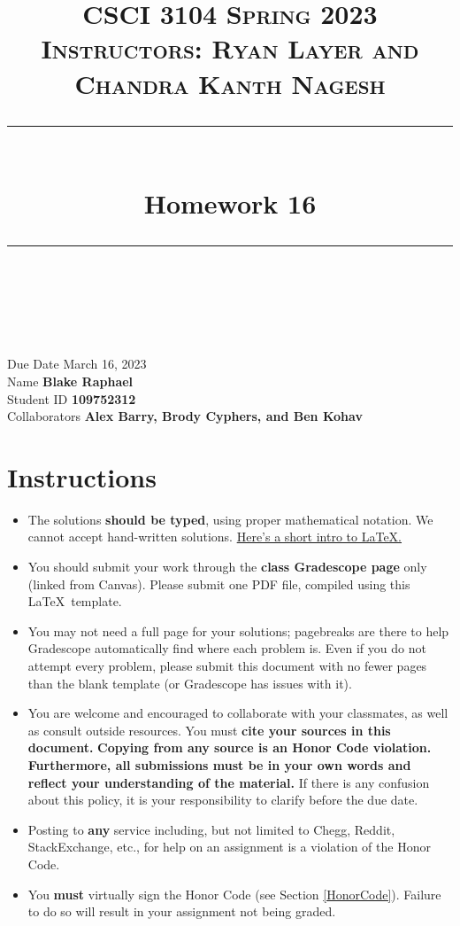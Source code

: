 \documentclass[11pt]{article}
\title{
\normalfont \normalsize 
\textsc{CSCI 3104 Spring 2023 \\ 
Instructors: Ryan Layer and Chandra Kanth Nagesh} \\
[10pt] 
\rule{\linewidth}{0.5pt} \\[6pt] 
\huge Homework 16 \\
\rule{\linewidth}{2pt}  \\[10pt]
}
\author{}
\date{}
\theoremstyle{definition}
\theoremstyle{definition}
\theoremstyle{definition}
\begin{document}

\maketitle


\noindent
Due Date \dotfill March 16, 2023 \\
Name \dotfill \textbf{Blake Raphael} \\
Student ID \dotfill \textbf{109752312} \\
Collaborators \dotfill \textbf{Alex Barry, Brody Cyphers, and Ben Kohav}

\tableofcontents

\section{Instructions}
 \begin{itemize}
	\item The solutions \textbf{should be typed}, using proper mathematical notation. We cannot accept hand-written solutions. \href{http://ece.uprm.edu/~caceros/latex/introduction.pdf}{Here's a short intro to \LaTeX.}
	\item You should submit your work through the \textbf{class Gradescope page} only (linked from Canvas). Please submit one PDF file, compiled using this \LaTeX \ template.
	\item You may not need a full page for your solutions; pagebreaks are there to help Gradescope automatically find where each problem is. Even if you do not attempt every problem, please submit this document with no fewer pages than the blank template (or Gradescope has issues with it).

	\item You are welcome and encouraged to collaborate with your classmates, as well as consult outside resources. You must \textbf{cite your sources in this document.} \textbf{Copying from any source is an Honor Code violation. Furthermore, all submissions must be in your own words and reflect your understanding of the material.} If there is any confusion about this policy, it is your responsibility to clarify before the due date. 

	\item Posting to \textbf{any} service including, but not limited to Chegg, Reddit, StackExchange, etc., for help on an assignment is a violation of the Honor Code.

	\item You \textbf{must} virtually sign the Honor Code (see Section \ref{HonorCode}). Failure to do so will result in your assignment not being graded.
\end{itemize}
\end{document}
